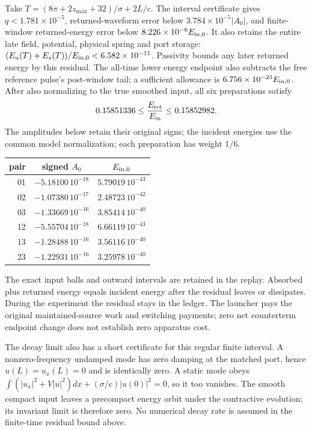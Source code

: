 \documentclass[10pt,twocolumn,letterpaper]{article}
\begin{document}
Take $T=(8\pi+2z_{\max}+32)/\sigma+2L/c$. The interval certificate gives
$q<1.781\times10^{-5}$, returned-waveform error below
$3.784\times10^{-5}|A_0|$, and finite-window returned-energy error below
$8.226\times10^{-6}E_{{\rm in},0}$. It also retains the entire late
field, potential, physical spring and port storage:
$(E_u(T)+E_s(T))/E_{{\rm in},0}<6.582\times10^{-11}$.
Passivity bounds any later returned energy by this residual. The all-time lower
energy endpoint also subtracts the free reference pulse's post-window tail;
a sufficient allowance is $6.756\times10^{-23}E_{{\rm in},0}$.\cite{ch5review} After also
normalizing to the true smoothed input, all six preparations satisfy
\begin{equation}
 0.15851336\leq\frac{E_{\rm ret}}{E_{\rm in}}\leq0.15852982.
 \label{eq:wp-final-return}
\end{equation}
The amplitudes below retain their original signs; the incident energies use the common model normalization;
each preparation has weight $1/6$.
\begin{center}
\small
\begin{tabular}{rcc}
\hline
pair & signed $A_0$ & $E_{{\rm in},0}$\\\hline
01 & $-5.18100\,10^{-18}$ & $5.79019\,10^{-43}$\\
02 & $-1.07380\,10^{-17}$ & $2.48723\,10^{-42}$\\
03 & $-1.33669\,10^{-16}$ & $3.85414\,10^{-40}$\\
12 & $-5.55704\,10^{-18}$ & $6.66119\,10^{-43}$\\
13 & $-1.28488\,10^{-16}$ & $3.56116\,10^{-40}$\\
23 & $-1.22931\,10^{-16}$ & $3.25978\,10^{-40}$\\\hline
\end{tabular}
\end{center}
The exact input balls and outward intervals are retained in the replay.
Absorbed plus returned energy equals incident energy after the residual
leaves or dissipates. During the experiment the residual stays in the
ledger. The launcher pays the original maintained-source work and
switching payments; zero net counterterm endpoint change does not establish
zero apparatus cost.

The decay limit also has a short certificate for this regular finite
interval. A nonzero-frequency undamped mode has zero damping at the matched
port, hence $u(L)=u_x(L)=0$ and is identically zero. A static mode obeys
$\int(|u_x|^2+V|u|^2)dx+(\sigma/c)|u(0)|^2=0$, so it too vanishes.
The smooth compact input leaves a precompact energy orbit under the
contractive evolution; its invariant limit is therefore zero. No numerical
decay rate is assumed in the finite-time residual bound above.
\end{document}
